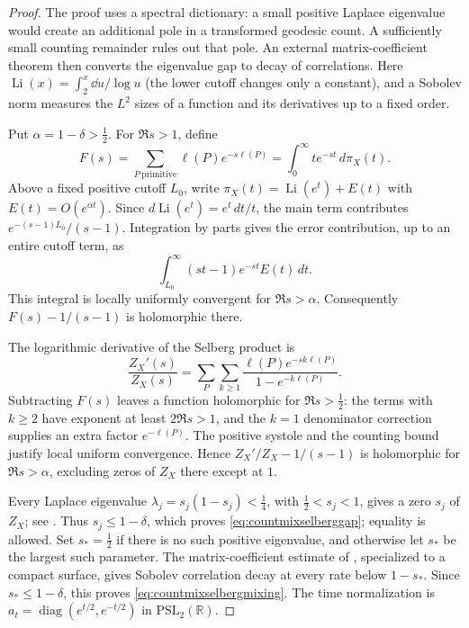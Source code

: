 \begin{proof}
The proof uses a spectral dictionary: a small positive Laplace
eigenvalue would create an additional pole in a transformed
geodesic count. A sufficiently small counting remainder rules out
that pole. An external matrix-coefficient theorem then converts
the eigenvalue gap to decay of correlations. Here
$\operatorname{Li}(x)=\int_2^x\dd u/\log u$ (the lower cutoff
changes only a constant), and a Sobolev norm measures the $L^2$
sizes of a function and its derivatives up to a fixed order.

Put $\alpha=1-\delta>\tfrac12$. For $\Re s>1$, define
\[
 F(s)=\sum_{P\ \mathrm{primitive}}\ell(P)e^{-s\ell(P)}
     =\int_0^\infty t e^{-st}\,d\pi_X(t).
\]
Above a fixed positive cutoff $L_0$, write
$\pi_X(t)=\operatorname{Li}(e^t)+E(t)$ with
$E(t)=O(e^{\alpha t})$. Since
$d\operatorname{Li}(e^t)=e^t\,dt/t$, the main term contributes
$e^{-(s-1)L_0}/(s-1)$. Integration by parts gives the error contribution,
up to an entire cutoff term, as
\[
 \int_{L_0}^\infty (st-1)e^{-st}E(t)\,dt.
\]
This integral is locally uniformly convergent for $\Re s>\alpha$.
Consequently $F(s)-1/(s-1)$ is holomorphic there.

The logarithmic derivative of the Selberg product is
\begin{equation}
 \frac{Z_X'(s)}{Z_X(s)}
 =\sum_P\sum_{k\geq1}
       \frac{\ell(P)e^{-sk\ell(P)}}{1-e^{-k\ell(P)}}.
 \label{eq:countmixselberglogderivative}
\end{equation}
Subtracting $F(s)$ leaves a function holomorphic for $\Re s>\tfrac12$:
the terms with $k\geq2$ have exponent at least $2\Re s>1$, and the
$k=1$ denominator correction supplies an extra factor $e^{-\ell(P)}$.
The positive systole and the counting bound justify local uniform
convergence. Hence $Z_X'/Z_X-1/(s-1)$ is holomorphic for
$\Re s>\alpha$, excluding zeros of $Z_X$ there except at $1$.

Every Laplace eigenvalue $\lambda_j=s_j(1-s_j)<\tfrac14$, with
$\tfrac12<s_j<1$, gives a zero $s_j$ of $Z_X$; see
\cite[Theorems~1.1 and~4.1]{BJPZeta}. Thus $s_j\leq1-\delta$,
which proves \eqref{eq:countmixselberggap}; equality is allowed.
Set $s_*=\tfrac12$ if there is no such positive eigenvalue, and otherwise
let $s_*$ be the largest such parameter. The matrix-coefficient estimate
of \cite[Theorem~1.1]{EdwardsOhMixing}, specialized to a compact surface,
gives Sobolev correlation decay at every rate below $1-s_*$.
Since $s_*\leq1-\delta$, this proves
\eqref{eq:countmixselbergmixing}. The time normalization is
$a_t=\operatorname{diag}(e^{t/2},e^{-t/2})$ in
$\mathrm{PSL}_2(\mathbb R)$.
\end{proof}

